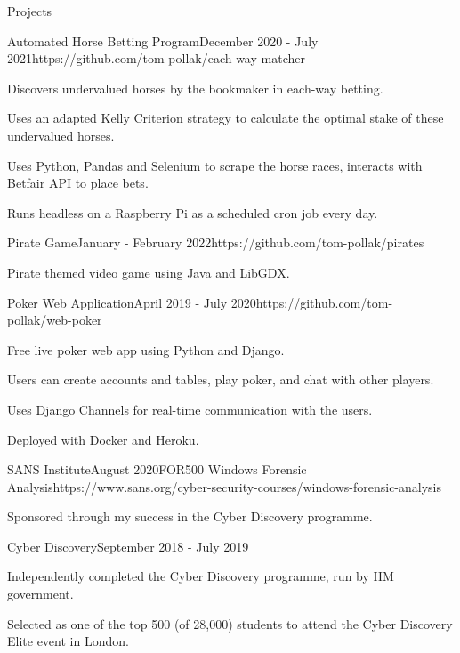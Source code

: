 \documentclass{structure}
\begin{document}
\begin{rSection}{Projects}

\begin{rSubsection}{Automated Horse Betting Program}{December 2020 - July 2021}{}{}{https://github.com/tom-pollak/each-way-matcher}
    \item Discovers undervalued horses by the bookmaker in each-way betting.
    \item Uses an adapted Kelly Criterion strategy to calculate the optimal stake of these undervalued horses.
    \item Uses Python, Pandas and Selenium to scrape the horse races, interacts with Betfair API to place bets.
    \item Runs headless on a Raspberry Pi as a scheduled cron job every day.
\end{rSubsection}

\begin{rSubsection}{Pirate Game}{January - February 2022}{}{}{https://github.com/tom-pollak/pirates}
    \item Pirate themed video game using Java and LibGDX.
\end{rSubsection}

\begin{rSubsection}{Poker Web Application}{April 2019 - July 2020}{}{}{https://github.com/tom-pollak/web-poker}
    \item Free live poker web app using Python and Django.
    \item Users can create accounts and tables, play poker, and chat with other players.
    \item Uses Django Channels for real-time communication with the users.
    \item Deployed with Docker and Heroku.
\end{rSubsection}

\begin{rSubsection}{SANS Institute}{August 2020}{FOR500 Windows Forensic Analysis}{}{https://www.sans.org/cyber-security-courses/windows-forensic-analysis}
    \item Sponsored through my success in the Cyber Discovery programme.
\end{rSubsection}

\begin{rSubsection}{Cyber Discovery}{September 2018 - July 2019}{}{}{}
    \item Independently completed the Cyber Discovery programme, run by HM government.
    \item Selected as one of the top 500 (of 28,000) students to attend the Cyber Discovery Elite event in London.
\end{rSubsection}

\end{rSection}
\end{document}
